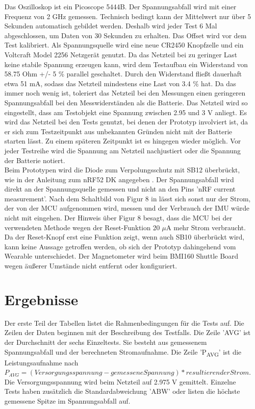 Das Oszilloskop ist ein Picoscope 5444B.
Der Spannungsabfall wird mit einer Frequenz von 2 GHz gemessen.
Technisch bedingt kann der Mittelwert nur über 5 Sekunden automatisch gebildet werden.
Deshalb wird jeder Test 6 Mal abgeschlossen, um Daten von 30 Sekunden zu erhalten.
Das Offset wird vor dem Test kalibriert.
Als Spannungsquelle wird eine neue CR2450 Knopfzelle und ein Voltcraft Model 2256 Netzgerät genutzt.
Da das Netzteil bei zu geringer Last keine stabile Spannung erzeugen kann, wird dem Testaufbau ein Widerstand von 58.75 Ohm +/- 5 \% parallel geschaltet.
Durch den Widerstand fließt dauerhaft etwa 51 mA, sodass das Netzteil mindestens eine Last von 3.4 \% hat.
Da das immer noch wenig ist, toleriert das Netzteil bei den Messungen einen geringeren Spannungsabfall bei den Messwiderständen als die Batterie.
Das Netzteil wird so eingestellt, dass am Testobjekt eine Spannung zwischen 2.95 und 3 V anliegt.
Es wird das Netzteil bei den Tests genutzt, bei denen der Prototyp involviert ist, da er sich zum Testzeitpunkt aus unbekannten Gründen nicht mit der Batterie starten lässt.
Zu einem späteren Zeitpunkt ist es hingegen wieder möglich.
Vor jeder Testreihe wird die Spannung am Netzteil nachjustiert oder die Spannung der Batterie notiert.\\
Beim Prototypen wird die Diode zum Verpolungsschutz mit SB12 überbrückt, wie in der Anleitung zum nRF52 DK angegeben \cite{site_nrf52dk}.
Der Spannungsabfall wird direkt an der Spannungsquelle gemessen und nicht an den Pins 'nRF current measurement'.
Nach dem Schaltbild von Figur 8 in \cite{site_nrf52dk} lässt sich sonst nur der Strom, der von der MCU aufgenommen wird, messen und der Verbrauch der IMU würde nicht mit eingehen.
Der Hinweis über Figur 8 besagt, dass die MCU bei der verwendeten Methode wegen der Reset-Funktion 20 $\mu$A mehr Strom verbraucht.
Da der Reset-Knopf erst eine Funktion zeigt, wenn auch SB10 überbrückt wird, kann keine Aussage getroffen werden, ob sich der Prototyp dahingehend vom Wearable unterschiedet.
Der Magnetometer wird beim BMI160 Shuttle Board wegen äußerer Umstände nicht entfernt oder konfiguriert.

\section{Ergebnisse}
Der erste Teil der Tabellen listet die Rahmenbedingungen für die Tests auf.
Die Zeilen der Daten beginnen mit der Beschreibung des Testfalls.
Die Zeile 'AVG' ist der Durchschnitt der sechs Einzeltests.
Sie besteht aus gemessenem Spannungsabfall und der berechneten Stromaufnahme.
Die Zeile 'P\textsubscript{AVG}' ist die Leistungsaufnahme nach $P_{AVG} = (Versorgungsspannung - gemesseneSpannung) * resultierender Strom$.
Die Versorgungsspannung wird beim Netzteil auf 2.975 V gemittelt.
Einzelne Tests haben zusätzlich die Standardabweichung 'ABW' oder listen die höchste gemessene Spitze im Spannungsabfall auf.

